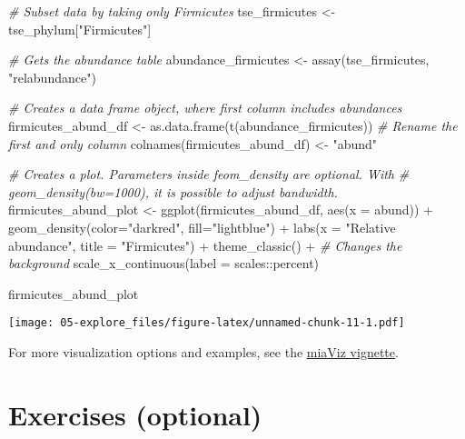 \documentclass[
  oneside]{book}
\newenvironment{Shaded}{\begin{snugshade}}{\end{snugshade}}
\newcommand{\AttributeTok}[1]{\textcolor[rgb]{0.77,0.63,0.00}{#1}}
\newcommand{\CommentTok}[1]{\textcolor[rgb]{0.56,0.35,0.01}{\textit{#1}}}
\newcommand{\FunctionTok}[1]{\textcolor[rgb]{0.00,0.00,0.00}{#1}}
\newcommand{\NormalTok}[1]{#1}
\newcommand{\OtherTok}[1]{\textcolor[rgb]{0.56,0.35,0.01}{#1}}
\newcommand{\SpecialCharTok}[1]{\textcolor[rgb]{0.00,0.00,0.00}{#1}}
\newcommand{\StringTok}[1]{\textcolor[rgb]{0.31,0.60,0.02}{#1}}
\begin{document}
\begin{Shaded}
\begin{Highlighting}[]
\CommentTok{\# Subset data by taking only Firmicutes}
\NormalTok{tse\_firmicutes }\OtherTok{\textless{}{-}}\NormalTok{ tse\_phylum[}\StringTok{"Firmicutes"}\NormalTok{]}

\CommentTok{\# Gets the abundance table}
\NormalTok{abundance\_firmicutes }\OtherTok{\textless{}{-}} \FunctionTok{assay}\NormalTok{(tse\_firmicutes, }\StringTok{"relabundance"}\NormalTok{)}

\CommentTok{\# Creates a data frame object, where first column includes abundances}
\NormalTok{firmicutes\_abund\_df }\OtherTok{\textless{}{-}} \FunctionTok{as.data.frame}\NormalTok{(}\FunctionTok{t}\NormalTok{(abundance\_firmicutes))}
\CommentTok{\# Rename the first and only column}
\FunctionTok{colnames}\NormalTok{(firmicutes\_abund\_df) }\OtherTok{\textless{}{-}} \StringTok{"abund"}

\CommentTok{\# Creates a plot. Parameters inside feom\_density are optional. With }
\CommentTok{\# geom\_density(bw=1000), it is possible to adjust bandwidth.}
\NormalTok{firmicutes\_abund\_plot }\OtherTok{\textless{}{-}} \FunctionTok{ggplot}\NormalTok{(firmicutes\_abund\_df, }\FunctionTok{aes}\NormalTok{(}\AttributeTok{x =}\NormalTok{ abund)) }\SpecialCharTok{+} 
  \FunctionTok{geom\_density}\NormalTok{(}\AttributeTok{color=}\StringTok{"darkred"}\NormalTok{, }\AttributeTok{fill=}\StringTok{"lightblue"}\NormalTok{) }\SpecialCharTok{+} 
  \FunctionTok{labs}\NormalTok{(}\AttributeTok{x =} \StringTok{"Relative abundance"}\NormalTok{, }\AttributeTok{title =} \StringTok{"Firmicutes"}\NormalTok{) }\SpecialCharTok{+}
  \FunctionTok{theme\_classic}\NormalTok{() }\SpecialCharTok{+} \CommentTok{\# Changes the background}
  \FunctionTok{scale\_x\_continuous}\NormalTok{(}\AttributeTok{label =}\NormalTok{ scales}\SpecialCharTok{::}\NormalTok{percent)}

\NormalTok{firmicutes\_abund\_plot}
\end{Highlighting}
\end{Shaded}

\texttt{[image: 05-explore\_files/figure-latex/unnamed-chunk-11-1.pdf]}

For more visualization options and examples, see the \href{https://microbiome.github.io/miaViz/articles/miaViz.html}{miaViz vignette}.

\hypertarget{exercises-optional}{%
\section{Exercises (optional)}\label{exercises-optional}}
\end{document}
